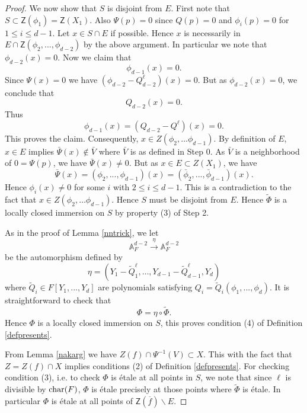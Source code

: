 \documentclass[10pt]{amsart}
\theoremstyle{plain}
\theoremstyle{definition}
\newcommand{\intersection}{\cap}
\newcommand{\Char}{{\rm char}}
\renewcommand{\tilde}{\widetilde}
\newcommand{\A}{{\mathbb A}}
\let\syn\mathsf
\begin{document}
\begin{proof}
We now show that $S$ is disjoint from $E$. First note that 
 $S \subset \syn{Z}(\phi_1)=\syn{Z}(X_1)$. Also {$\Psi(p)=0$ since $Q(p)=0$ and $\phi_i(p)=0$ for $1\leq i\leq d-1$}. Let $x\in S\intersection E$ if possible. Hence $x$ is necessarily in $E\intersection \syn{Z}(\phi_2,...,\phi_{d-2})$ by the above argument. In particular we note that $\phi_{d-2}(x)=0$.  Now we claim that 
 $$ \phi_{d-1}(x)=0.$$ 
 Since $\Psi(x)=0$ we have $(\phi_{d-2}-Q_{d-2}^\ell)(x)=0$. But as $\phi_{d-2}(x)=0$, we conclude that $$ Q_{d-2}(x)=0.$$
 Thus $$\phi_{d-1}(x)=(Q_{d-2}-Q^{\ell})(x)=0.$$
 This proves the claim. 
 Consequently, $x\in Z(\phi_2,\ldots\phi_{d-1})$.
By definition of $E$, $x \in E$ implies  $\bar{\Psi}(x)\notin \bar{V}$ where $\bar{V}$ is as defined in Step 0.   As $\bar{V}$ is a neighborhood of $0=\Psi(p)$, we have $\bar{\Psi}(x) \neq0$. But as $x\in E \subset Z(X_1)$, we have $$  \bar{\Psi}(x)= (\phi_2,...,\phi_{d-1})(x)=(\bar{\phi}_2,...,\bar{\phi}_{d-1})(x).$$   Hence $\phi_i(x)\neq 0 $ for some $ i$ with $2\leq i \leq d-1.$ This is a contradiction to the fact that $x\in Z(\phi_2,\ldots\phi_{d-1})$. 
Hence $S$ must be disjoint from $E$. Hence $ \tilde{\Phi}$ is a locally closed immersion on $S$ by property (3) of Step 2.

 As in the proof of Lemma \ref{nntrick}, we let  $$\A^{d-2}_F\xrightarrow{\ \ \eta\ \  } \A^{d-2}_F$$ be the automorphism defined by 
  $$\eta={(Y_1-\tilde{Q}_1^\ell,\ldots,Y_{d-1}-\tilde{Q}_{d-1}^\ell,Y_d)}$$ where  $\tilde{Q}_i\in F[Y_1,...,Y_d]$ are polynomials satisfying $Q_i= \tilde{Q}_i(\phi_1,...,\phi_{d})$. 
 It is straightforward to check that 
 $$ \Phi = \eta \circ \tilde{\Phi}. $$
 Hence $\Phi$ is a locally closed immersion on $S$, this proves condition (4) of Definition \ref{defpresents}.

 From Lemma \ref{nakarg} we have $Z(f) \cap \Psi^{-1}(V) \subset X$. This with the fact that $Z=Z(f)\cap X$ implies conditions (2) of Definition \ref{defpresents}. For checking condition (3), i.e. to check $\Phi$ is \'{e}tale at all points in $S$, we note that 
  since $\ell$ is divisible by $\Char(F)$, $\Phi$ is \'{e}tale precisely at those points where $\widetilde{\Phi}$ is \'{e}tale. In particular $\Phi$ is \'{e}tale at all points of $\syn{Z}(\overline{f})\backslash E$.  
\end{proof}





\end{document}
